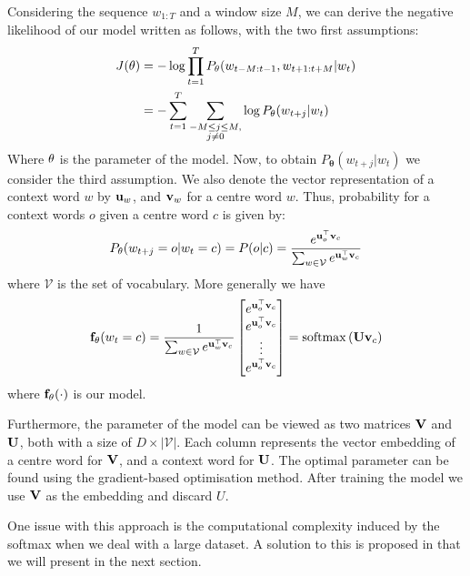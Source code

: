    Considering the sequence $w_{1:T}$ and a window size $M$, we can derive the negative likelihood of our model written as follows, with the two first assumptions:
   \begin{align}
   J(\mathbf{\theta}) &= -\log\prod_{t=1}^{T}P_{\mathbf{\theta}}(w_{t-M:t-1},w_{t+1:t+M}|w_t)\\
   &=-\sum_{t=1}^{T}\sum_{\substack{-M\leq j \leq M,\\ j\neq 0}}\log P_{\mathbf{\theta}}(w_{t+j}|w_t)
   \end{align}
   Where $\mathbf{\theta}$ is the parameter of the model. Now, to obtain $P_{\mathbf{\theta}}(w_{t+j}|w_t)$ we consider the third assumption. We also denote the vector representation of a context word $w$ by $\mathbf{u}_w$, and $\mathbf{v}_w$ for a centre word $w$. Thus, probability for a context words $o$ given a centre word $c$ is given by:
   \begin{equation}
	P_{\mathbf{\theta}}(w_{t+j}=o|w_t=c) = P(o|c) = \frac{e^{\mathbf{u}_o^\top\mathbf{v}_c}}{\sum_{w\in \mathcal{V}}e^{\mathbf{u}_{w}^\top\mathbf{v}_c}}
   \end{equation}
   where $\mathcal{V}$ is the set of vocabulary. More generally we have
   \begin{equation}
	\mathbf{f_\theta}(w_t=c)=\frac{1}{\sum_{w\in \mathcal{V}}e^{\mathbf{u}_{w}^\top\mathbf{v}_c}}\begin{bmatrix}
	e^{\mathbf{u}_o^\top\mathbf{v}_c}\\
	e^{\mathbf{u}_o^\top\mathbf{v}_c}\\
	\vdots\\
	e^{\mathbf{u}_o^\top\mathbf{v}_c}\\
	\end{bmatrix}
	= \mathrm{softmax}\left(\mathbf{Uv}_c\right)
   \end{equation}
   where $\mathbf{f_\theta}(\cdot)$ is our model.

   Furthermore, the parameter of the model can be viewed as two matrices $\mathbf{V}$ and $\mathbf{U}$, both with a size of $D \times |\mathcal{V}|$. Each column represents the vector embedding of a centre word for $\mathbf{V}$, and a context word for $\mathbf{U}$. The optimal parameter can be found using the gradient-based optimisation method. After training the model we use $\mathbf{V}$ as the embedding and discard $U$.

   One issue with this approach is the computational complexity induced by the softmax when we deal with a large dataset. A solution to this is proposed in \cite{sgns} that we will present in the next section.
